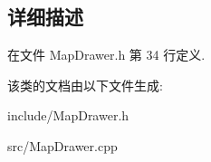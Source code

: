 \subsection{详细描述}


在文件 Map\-Drawer.\-h 第 34 行定义.



该类的文档由以下文件生成\-:\begin{DoxyCompactItemize}
\item 
include/Map\-Drawer.\-h\item 
src/Map\-Drawer.\-cpp\end{DoxyCompactItemize}
